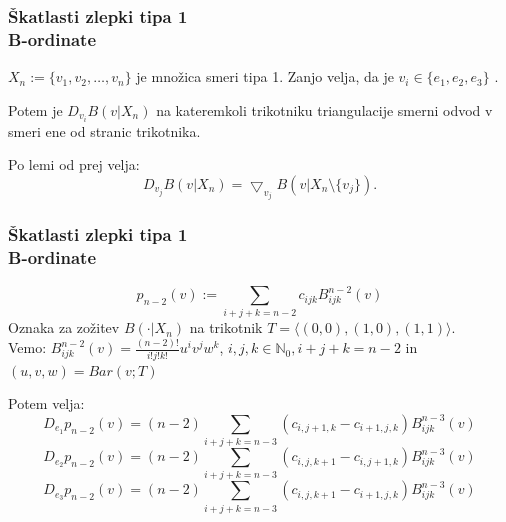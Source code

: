 \documentclass{beamer}
\begin{document}
\begin{frame}
\frametitle{Škatlasti zlepki tipa 1 \\ B-ordinate}

$X_n := \{v_1, v_2, \ldots , v_n\}$ je množica smeri tipa 1. Zanjo velja, da je $v_i \in \{e_1, e_2, e_3\}$ .

Potem je $D_{v_i} B(v|X_n)$ na kateremkoli trikotniku triangulacije smerni odvod v smeri ene od stranic trikotnika. 

Po lemi od prej velja: $$D_{v_j} B(v|X_n) = \bigtriangledown_{v_j} B(v | X_n \setminus \{v_j\}).$$
\end{frame}


\begin{frame}
\frametitle{Škatlasti zlepki tipa 1 \\ B-ordinate}

$$p_{n-2} (v) := \sum_{i+j+k=n-2} c_{ijk} B_{ijk}^{n-2}(v)$$
Oznaka za zožitev $B(\cdot | X_n)$ na trikotnik $T = \langle (0,0), (1, 0), (1,1)\rangle$.\\
Vemo: $B_{ijk}^{n-2}(v) = \frac{(n-2)!}{i! j! k!} u^i v^j w^k$, $i, j, k \in \mathbb{N}_0, i+j+k=n-2$ in $(u,v, w ) = Bar(v; T)$

Potem velja:
$$D_{e_1} p_{n-2} (v) = (n-2)\sum_{i+j+k=n-3} (c_{i,j+1,k} - c_{i+1, j, k}) B_{ijk}^{n-3}(v)$$
$$D_{e_2} p_{n-2} (v) = (n-2)\sum_{i+j+k=n-3} (c_{i,j,k+1} - c_{i, j+1, k}) B_{ijk}^{n-3}(v)$$
$$D_{e_3} p_{n-2} (v) = (n-2)\sum_{i+j+k=n-3} (c_{i,j,k+1} - c_{i+1, j, k}) B_{ijk}^{n-3}(v)$$

\end{frame}


\end{document}
